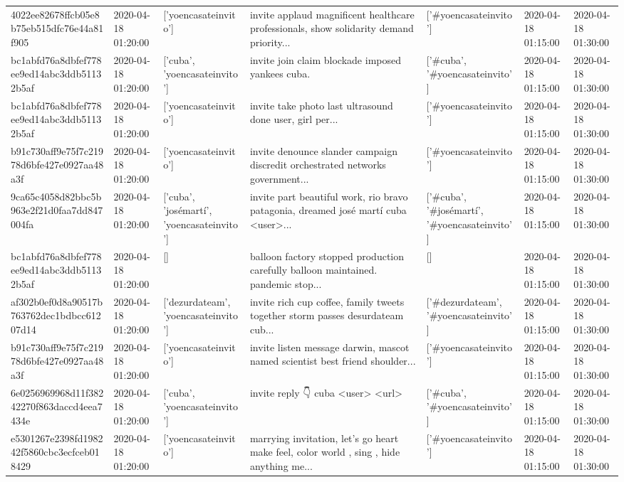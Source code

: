 \begin{tabular}{lllllll}
4022ee82678ffcb05e8b75eb515dfc76e44a81f905 & 2020-04-18 01:20:00 & ['yoencasateinvito'] & invite applaud magnificent healthcare professionals, show solidarity demand priority... & ['#yoencasateinvito'] & 2020-04-18 01:15:00 & 2020-04-18 01:30:00 \\
bc1abfd76a8dbfef778ee9ed14abc3ddb51132b5af & 2020-04-18 01:20:00 & ['cuba', 'yoencasateinvito'] & invite join claim blockade imposed yankees cuba. & ['#cuba', '#yoencasateinvito'] & 2020-04-18 01:15:00 & 2020-04-18 01:30:00 \\
bc1abfd76a8dbfef778ee9ed14abc3ddb51132b5af & 2020-04-18 01:20:00 & ['yoencasateinvito'] & invite take photo last ultrasound done user, girl per... & ['#yoencasateinvito'] & 2020-04-18 01:15:00 & 2020-04-18 01:30:00 \\
b91c730aff9e75f7c21978d6bfe427e0927aa48a3f & 2020-04-18 01:20:00 & ['yoencasateinvito'] & invite denounce slander campaign discredit orchestrated networks government... & ['#yoencasateinvito'] & 2020-04-18 01:15:00 & 2020-04-18 01:30:00 \\
9ca65c4058d82bbc5b963e2f21d0faa7dd847004fa & 2020-04-18 01:20:00 & ['cuba', 'josémartí', 'yoencasateinvito'] & invite part beautiful work, rio bravo patagonia, dreamed josé martí cuba <user>... & ['#cuba', '#josémartí', '#yoencasateinvito'] & 2020-04-18 01:15:00 & 2020-04-18 01:30:00 \\
bc1abfd76a8dbfef778ee9ed14abc3ddb51132b5af & 2020-04-18 01:20:00 & [] & balloon factory stopped production carefully balloon maintained. pandemic stop... & [] & 2020-04-18 01:15:00 & 2020-04-18 01:30:00 \\
af302b0ef0d8a90517b763762dec1bdbcc61207d14 & 2020-04-18 01:20:00 & ['dezurdateam', 'yoencasateinvito'] & invite rich cup coffee, family tweets together storm passes desurdateam cub... & ['#dezurdateam', '#yoencasateinvito'] & 2020-04-18 01:15:00 & 2020-04-18 01:30:00 \\
b91c730aff9e75f7c21978d6bfe427e0927aa48a3f & 2020-04-18 01:20:00 & ['yoencasateinvito'] & invite listen message darwin, mascot named scientist best friend shoulder... & ['#yoencasateinvito'] & 2020-04-18 01:15:00 & 2020-04-18 01:30:00 \\
6e0256969968d11f38242270f863daccd4eea7434e & 2020-04-18 01:20:00 & ['cuba', 'yoencasateinvito'] & invite reply 👇 cuba <user> <url> & ['#cuba', '#yoencasateinvito'] & 2020-04-18 01:15:00 & 2020-04-18 01:30:00 \\
e5301267e2398fd198242f5860cbc3ecfceb018429 & 2020-04-18 01:20:00 & ['yoencasateinvito'] & marrying invitation, let's go heart 💖 make feel, color world , sing , hide anything me... & ['#yoencasateinvito'] & 2020-04-18 01:15:00 & 2020-04-18 01:30:00 \\

\end{tabular}
